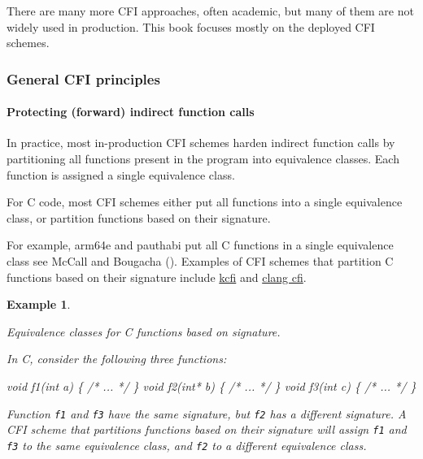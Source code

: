 \documentclass[
  a4paper,
]{report}
\newtheorem{example}{Example}
\newenvironment{Shaded}{}{}
\newcommand{\CommentTok}[1]{\textcolor[rgb]{0.38,0.63,0.69}{\textit{#1}}}
\newcommand{\DataTypeTok}[1]{\textcolor[rgb]{0.56,0.13,0.00}{#1}}
\newcommand{\NormalTok}[1]{#1}
\newcommand{\OperatorTok}[1]{\textcolor[rgb]{0.40,0.40,0.40}{#1}}
\begin{document}
There are many more CFI approaches, often academic, but many of them are
not widely used in production. This book focuses mostly on the deployed
CFI schemes.

\subsubsection{General CFI principles}\label{general-cfi-principles}

\paragraph{Protecting (forward) indirect function
calls}\label{protecting-forward-indirect-function-calls}

In practice, most in-production CFI schemes harden indirect function
calls by partitioning all functions present in the program into
equivalence classes. Each function is assigned
a single equivalence class.

For C code, most CFI schemes either put all functions into a single
equivalence class, or partition functions based on their
signature.

For example, arm64e and pauthabi put all C
functions in a single equivalence class see McCall and Bougacha
(). Examples of CFI schemes that
partition C functions based on their signature include
\href{https://reviews.llvm.org/D119296}{kcfi} and
\href{https://clang.llvm.org/docs/ControlFlowIntegrityDesign.html\#forward-edge-cfi-for-indirect-function-calls}{clang
cfi}.

\begin{example}

\label{}

\textup{Equivalence classes for C functions based on signature.}

In C, consider the following three functions:

\begin{Shaded}
\begin{Highlighting}[]
\DataTypeTok{void}\NormalTok{ f1}\OperatorTok{(}\DataTypeTok{int}\NormalTok{ a}\OperatorTok{)} \OperatorTok{\{} \CommentTok{/* ... */} \OperatorTok{\}}
\DataTypeTok{void}\NormalTok{ f2}\OperatorTok{(}\DataTypeTok{int}\OperatorTok{*}\NormalTok{ b}\OperatorTok{)} \OperatorTok{\{} \CommentTok{/* ... */} \OperatorTok{\}}
\DataTypeTok{void}\NormalTok{ f3}\OperatorTok{(}\DataTypeTok{int}\NormalTok{ c}\OperatorTok{)} \OperatorTok{\{} \CommentTok{/* ... */} \OperatorTok{\}}
\end{Highlighting}
\end{Shaded}

Function \texttt{f1} and \texttt{f3} have the same signature, but
\texttt{f2} has a different signature. A CFI scheme that partitions
functions based on their signature will assign \texttt{f1} and
\texttt{f3} to the same equivalence class, and \texttt{f2} to a
different equivalence class.

\end{example}
\end{document}
